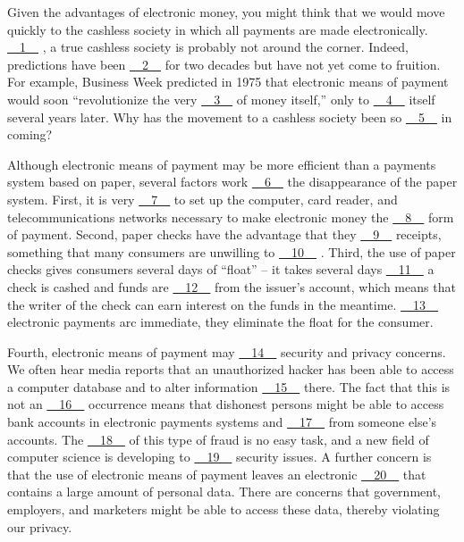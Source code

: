 Given the advantages of electronic money, you might think that we would move quickly to the cashless society in which all payments are made electronically. \uline{~~1~~} , a true cashless society is probably not around the corner. Indeed, predictions have been \uline{~~2~~} for two decades but have not yet come to fruition. For example, Business Week predicted in 1975 that electronic means of payment would soon ``revolutionize the very \uline{~~3~~} of money itself,'' only to \uline{~~4~~} itself several years later. Why has the movement to a cashless society been so \uline{~~5~~} in coming?


Although electronic means of payment may be more efficient than a payments system based on paper, several factors work \uline{~~6~~} the disappearance of the paper system. First, it is very \uline{~~7~~} to set up the computer, card reader, and telecommunications networks necessary to make electronic money the \uline{~~8~~} form of payment. Second, paper checks have the advantage that they \uline{~~9~~} receipts, something that many consumers are unwilling to \uline{~~10~~} . Third, the use of paper checks gives consumers several days of ``float'' – it takes several days \uline{~~11~~} a check is cashed and funds are \uline{~~12~~} from the issuer's account, which means that the writer of the check can earn interest on the funds in the meantime. \uline{~~13~~} electronic payments arc immediate, they eliminate the float for the consumer.


Fourth, electronic means of payment may \uline{~~14~~} security and privacy concerns. We often hear media reports that an unauthorized hacker has been able to access a computer database and to alter information \uline{~~15~~} there. The fact that this is not an \uline{~~16~~} occurrence means that dishonest persons might be able to access bank accounts in electronic payments systems and \uline{~~17~~} from someone else's accounts. The \uline{~~18~~} of this type of fraud is no easy task, and a new field of computer science is developing to \uline{~~19~~} security issues. A further concern is that the use of electronic means of payment leaves an electronic \uline{~~20~~} that contains a large amount of personal data. There are concerns that government, employers, and marketers might be able to access these data, thereby violating our privacy.
